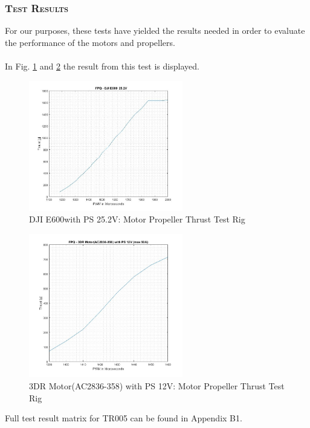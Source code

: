 \subsubsection*{\textsc{\medium Test Results}}
For our purposes, these tests have yielded the results needed in order to evaluate the performance of the motors and propellers.\\
\\
In Fig. \ref{fig:fpq3} and \ref{fig:fpq1} the result from this test is displayed. 
\begin{figure}[H]
    \centering
    \includegraphics[width = 0.6\textwidth]{VAPIQ-PICTURES/FPQ3}
    \caption{DJI E600with PS 25.2V: Motor Propeller Thrust Test Rig}
    \label{fig:fpq3}
\end{figure}

\begin{figure}[H]
    \centering
    \includegraphics[width = 0.6\textwidth]{VAPIQ-PICTURES/FPQ1}
    \caption{3DR Motor(AC2836-358) with PS 12V: Motor Propeller Thrust Test Rig}
    \label{fig:fpq1}
\end{figure}

\noindent
Full test result matrix for TR005 can be found in Appendix B1.
 
